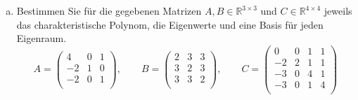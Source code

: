 \documentclass{scrreprt}
\begin{document}
\begin{enumerate}[(a)]
\newpage
\item Bestimmen Sie für die gegebenen Matrizen $A, B \in \mathbb{R}^{3 \times 3}$
  und $C \in \mathbb{R}^{4 \times 4}$ jeweils das charakteristische Polynom, die
  Eigenwerte und eine Basis für jeden Eigenraum.
  \[
    A = \begin{pmatrix}
      4  & 0 & 1 \\
      -2 & 1 & 0 \\
      -2 & 0 & 1 \\
    \end{pmatrix}, \qquad
    B = \begin{pmatrix}
      2 & 3 & 3 \\
      3 & 2 & 3 \\
      3 & 3 & 2 \\
    \end{pmatrix}, \qquad
    C = \begin{pmatrix}
      0  & 0 & 1 & 1 \\
      -2 & 2 & 1 & 1 \\
      -3 & 0 & 4 & 1 \\
      -3 & 0 & 1 & 4 \\
    \end{pmatrix}
  \]


\end{enumerate}
\end{document}
